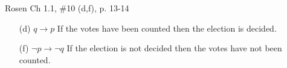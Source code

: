 \documentclass[12pt,addpoints]{exam}
\newcommand{\ra}{\rightarrow}
\newcommand{\lra}{\leftrightarrow}
\begin{document}
\begin{questions}
\question Rosen Ch 1.1, \#10 (d,f), p. 13-14
    \ifprintanswers
        \vspace{-15pt}
    \fi
    \begin{solution}
        \begin{itemize}[itemsep=0pt,parsep=0pt,topsep=0pt,partopsep=0pt]
        \item[(d)] $q \ra p$
        If the votes have been counted then the election is decided.
        \item[(f)] $\neg p \ra \neg q$
        If the election is not decided then the votes have not been counted.
        \end{itemize}
    \end{solution}



\end{questions}
\end{document}
